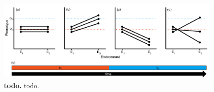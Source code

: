 \begin{figure}[h!]
    \centering
    \includegraphics[width=\textwidth]{media/reaction-norms.pdf}
    \caption{\small
    \textbf{todo.}
    todo.
    }
    \label{fig:reaction-norms}
\end{figure}

